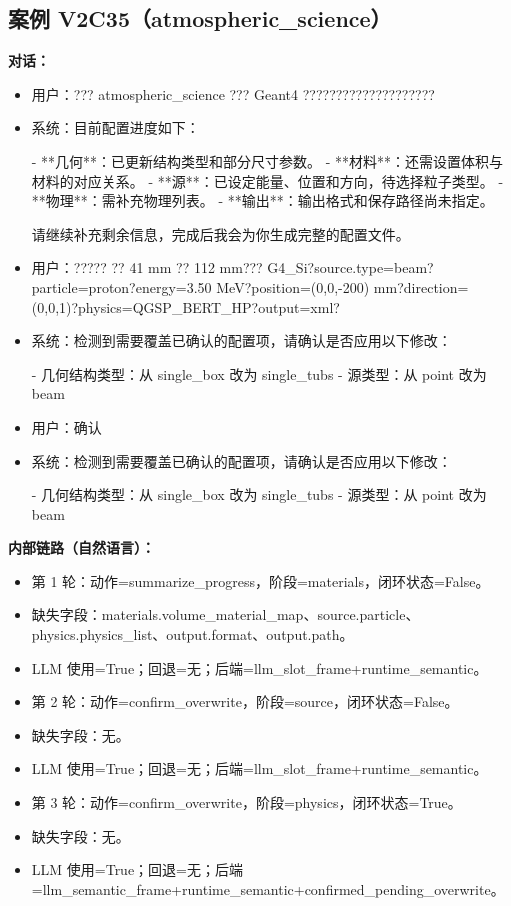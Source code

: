 \documentclass[11pt]{ctexart}
\begin{document}
\subsection{案例 V2C35（atmospheric\_science）}
\textbf{对话：}
\begin{itemize}
\item 用户：??? atmospheric\_science ??? Geant4 ????????????????????
\item 系统：目前配置进度如下：

- **几何**：已更新结构类型和部分尺寸参数。
- **材料**：还需设置体积与材料的对应关系。
- **源**：已设定能量、位置和方向，待选择粒子类型。
- **物理**：需补充物理列表。
- **输出**：输出格式和保存路径尚未指定。

请继续补充剩余信息，完成后我会为你生成完整的配置文件。
\item 用户：????? ?? 41 mm ?? 112 mm??? G4\_Si?source.type=beam?particle=proton?energy=3.50 MeV?position=(0,0,-200) mm?direction=(0,0,1)?physics=QGSP\_BERT\_HP?output=xml?
\item 系统：检测到需要覆盖已确认的配置项，请确认是否应用以下修改：

- 几何结构类型：从 single\_box 改为 single\_tubs
- 源类型：从 point 改为 beam
\item 用户：确认
\item 系统：检测到需要覆盖已确认的配置项，请确认是否应用以下修改：

- 几何结构类型：从 single\_box 改为 single\_tubs
- 源类型：从 point 改为 beam
\end{itemize}
\textbf{内部链路（自然语言）：}
\begin{itemize}
\item 第 1 轮：动作=summarize\_progress，阶段=materials，闭环状态=False。
\item 缺失字段：materials.volume\_material\_map、source.particle、physics.physics\_list、output.format、output.path。
\item LLM 使用=True；回退=无；后端=llm\_slot\_frame+runtime\_semantic。
\item 第 2 轮：动作=confirm\_overwrite，阶段=source，闭环状态=False。
\item 缺失字段：无。
\item LLM 使用=True；回退=无；后端=llm\_slot\_frame+runtime\_semantic。
\item 第 3 轮：动作=confirm\_overwrite，阶段=physics，闭环状态=True。
\item 缺失字段：无。
\item LLM 使用=True；回退=无；后端=llm\_semantic\_frame+runtime\_semantic+confirmed\_pending\_overwrite。
\end{itemize}
\end{document}
